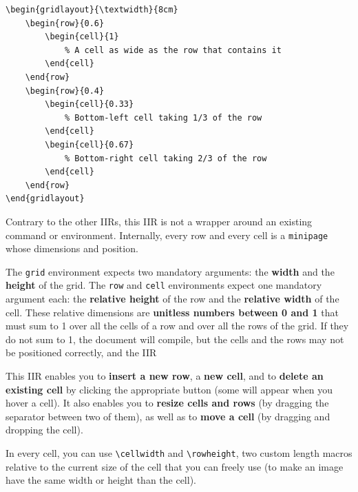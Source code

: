 \documentclass[11pt, a4paper]{article}
\begin{document}
\begin{lstlisting}[style=custom-latex]
% this grid is as wide as the text (\textwidth) and 8cm tall
\begin{gridlayout}{\textwidth}{8cm}
    \begin{row}{0.6}
        \begin{cell}{1}
            % A cell as wide as the row that contains it
        \end{cell}
    \end{row}
    \begin{row}{0.4}
        \begin{cell}{0.33}
            % Bottom-left cell taking 1/3 of the row
        \end{cell}
        \begin{cell}{0.67}
            % Bottom-right cell taking 2/3 of the row
        \end{cell}
    \end{row}
\end{gridlayout}
\end{lstlisting}

Contrary to the other IIRs, this IIR is not a wrapper around an existing command or environment.
Internally, every row and every cell is a \texttt{minipage} whose dimensions and position.

The \texttt{grid} environment expects two mandatory arguments: the \textbf{width} and the \textbf{height} of the grid.
The \texttt{row} and \texttt{cell} environments expect one mandatory argument each: the \textbf{relative height} of the row and the \textbf{relative width} of the cell.
These relative dimensions are \textbf{unitless numbers between 0 and 1} that must sum to 1 over all the cells of a row and over all the rows of the grid.
If they do not sum to 1, the document will compile, but the cells and the rows may not be positioned correctly, and the IIR 

This IIR enables you to \textbf{insert a new row}, a \textbf{new cell}, and to \textbf{delete an existing cell} by clicking the appropriate button (some will appear when you hover a cell). It also enables you to \textbf{resize cells and rows} (by dragging the separator between two of them), as well as to \textbf{move a cell} (by dragging and dropping the cell).

\begin{info}
    In every cell, you can use \verb|\cellwidth| and \verb|\rowheight|, two custom length macros relative to the current size of the cell that you can freely use (\eg to make an image have the same width or height than the cell).
\end{info}
\end{document}
